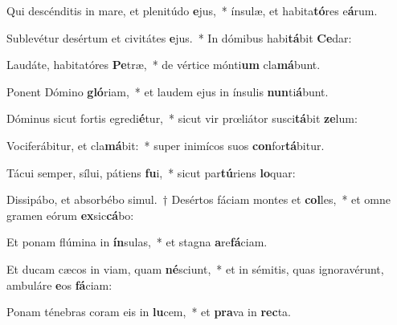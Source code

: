 \item Qui descénditis in mare, et plenitúdo \textbf{e}jus,~* ínsulæ, et habita\textbf{tó}res e\textbf{á}rum.
\item Sublevétur desértum et civitátes \textbf{e}jus.~* In dómibus habi\textbf{tá}bit \textbf{Ce}dar:
\item Laudáte, habitatóres \textbf{Pe}træ,~* de vértice mónti\textbf{um} cla\textbf{má}bunt.
\item Ponent Dómino \textbf{gló}riam,~* et laudem ejus in ínsulis \textbf{nun}ti\textbf{á}bunt.
\item Dóminus sicut fortis egredi\textbf{é}tur,~* sicut vir prœliátor susci\textbf{tá}bit \textbf{ze}lum:
\item Vociferábitur, et cla\textbf{má}bit:~* super inimícos suos \textbf{con}for\textbf{tá}bitur.
\item Tácui semper, sílui, pátiens \textbf{fu}i,~* sicut par\textbf{tú}riens \textbf{lo}quar:
\item Dissipábo, et absorbébo simul.~† Desértos fáciam montes et \textbf{col}les,~* et omne gramen eórum \textbf{ex}sic\textbf{cá}bo:
\item Et ponam flúmina in \textbf{ín}sulas,~* et stagna \textbf{a}re\textbf{fá}ciam.
\item Et ducam cæcos in viam, quam \textbf{né}sciunt,~* et in sémitis, quas ignoravérunt, ambuláre \textbf{e}os \textbf{fá}ciam:
\item Ponam ténebras coram eis in \textbf{lu}cem,~* et \textbf{pra}va in \textbf{rec}ta.
